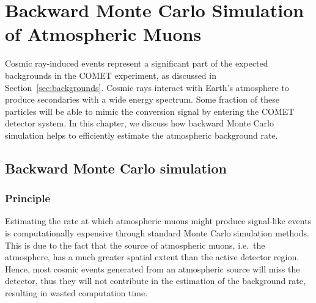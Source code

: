 \chapter[Backward Monte Carlo
Simulation of Atmospheric Muons]{Backward Monte Carlo
Simulation \\of Atmospheric Muons}\label{ch:cosmics}








Cosmic ray-induced events represent a significant part of the expected
backgrounds in the COMET experiment, as discussed in
Section~\ref{sec:backgrounds}. Cosmic rays interact with Earth's atmosphere to
produce secondaries with a wide energy spectrum. Some fraction of these
particles will be able to mimic the conversion signal by entering the COMET
detector system. In this chapter, we discuss how backward Monte Carlo simulation
helps to efficiently estimate the atmospheric background rate.

\section{Backward Monte Carlo simulation}

\subsection{Principle}\label{sec:bmc_principle}
Estimating the rate at which atmospheric muons might produce signal-like events
is computationally expensive through standard Monte Carlo simulation methods.
This is due to the fact that the source of atmospheric muons, i.e.\ the
atmosphere, has a much greater spatial extent than the active detector region.
Hence, most cosmic events generated from an atmospheric source will miss the
detector, thus they will not contribute in the estimation of the background
rate, resulting in wasted computation time.

